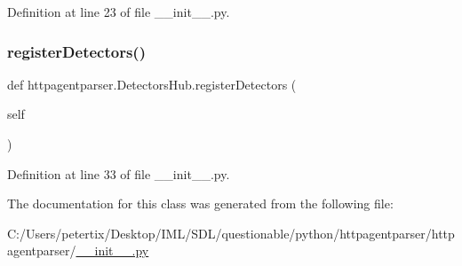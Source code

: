 Definition at line 23 of file \+\_\+\+\_\+init\+\_\+\+\_\+.\+py.

\hypertarget{classhttpagentparser_1_1_detectors_hub_a5f500e3fc543a7981556a0a9e9d1241c}{}\label{classhttpagentparser_1_1_detectors_hub_a5f500e3fc543a7981556a0a9e9d1241c} 
\subsubsection{\texorpdfstring{register\+Detectors()}{registerDetectors()}}
{\footnotesize\ttfamily def httpagentparser.\+Detectors\+Hub.\+register\+Detectors (\begin{DoxyParamCaption}\item[{}]{self }\end{DoxyParamCaption})}



Definition at line 33 of file \+\_\+\+\_\+init\+\_\+\+\_\+.\+py.



The documentation for this class was generated from the following file\+:\begin{DoxyCompactItemize}
\item 
C\+:/\+Users/petertix/\+Desktop/\+I\+M\+L/\+S\+D\+L/questionable/python/httpagentparser/httpagentparser/\hyperlink{____init_____8py}{\+\_\+\+\_\+init\+\_\+\+\_\+.\+py}\end{DoxyCompactItemize}
